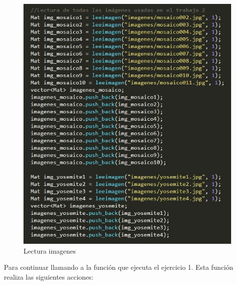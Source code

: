 \begin{figure}[H]
\centering
\includegraphics[width=0.7\linewidth]{lectura_im}
\caption{Lectura imagenes}
\end{figure}

Para continuar llamando a la función que ejecuta el ejercicio 1. Esta función realiza las siguientes acciones:

